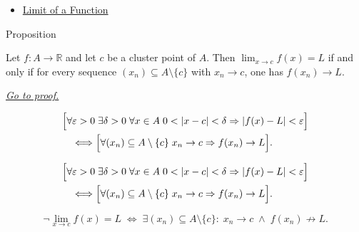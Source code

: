 \begin{dependencies}
\begin{itemize}
  \item \hyperref[def:limit-function]{Limit of a Function}
\end{itemize}
\end{dependencies}


\begin{propositionbox}{Proposition}
\begin{proposition}
\label{prop:sequential-criterion-limits}
Let $f : A \to \mathbb{R}$ and let $c$ be a cluster point of $A$.
Then $\lim_{x\to c}f(x)=L$ if and only if for every sequence
$(x_n)\subseteq A\setminus\{c\}$ with $x_n\to c$, one has
$f(x_n)\to L$.

\smallskip\noindent
\hyperref[prf:sequential-criterion-limits]{\textit{Go to proof.}}
\end{proposition}
\end{propositionbox}

\begin{remark*}
\[
\begin{aligned}
&\Bigl[\forall\varepsilon>0\;\exists\delta>0\;\forall x\in A\;
  0<|x-c|<\delta\Rightarrow |f(x)-L|<\varepsilon\Bigr] \\
&\quad\Longleftrightarrow
\Bigl[\forall (x_n)\subseteq A\setminus\{c\}\;
  x_n\to c\Rightarrow f(x_n)\to L\Bigr].
\end{aligned}
\]
\end{remark*}

\begin{remark*}
\[
\begin{aligned}
&\Bigl[\forall\varepsilon>0\;\exists\delta>0\;\forall x\in A\;
  0<|x-c|<\delta\Rightarrow |f(x)-L|<\varepsilon\Bigr] \\
&\quad\Longleftrightarrow
\Bigl[\forall (x_n)\subseteq A\setminus\{c\}\;
  x_n\to c\Rightarrow f(x_n)\to L\Bigr].
\end{aligned}
\]
\end{remark*}

\begin{remark*}
\[
  \neg\lim_{x\to c}f(x)=L
  \;\iff\;
  \exists (x_n) \subseteq A \setminus \{c\} :\;
  x_n \to c \;\wedge\; f(x_n) \not\to L.
\]
\end{remark*}

